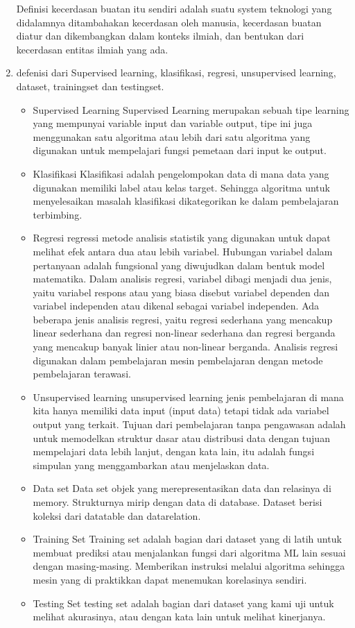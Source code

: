 \begin{enumerate}
	Definisi kecerdasan buatan itu sendiri adalah suatu system teknologi yang didalamnya ditambahakan kecerdasan oleh manusia, kecerdasan buatan diatur dan dikembangkan dalam konteks ilmiah, dan bentukan dari kecerdasan entitas ilmiah yang ada.
	\item defenisi dari Supervised learning, klasifikasi, regresi, unsupervised learning, dataset, trainingset dan testingset.
	\begin{itemize}
		\item Supervised Learning
		\hfill\break
		Supervised Learning merupakan sebuah tipe learning yang mempunyai variable input dan variable output, tipe ini juga menggunakan satu algoritma atau lebih dari satu algoritma yang digunakan untuk mempelajari fungsi  pemetaan dari input ke output.
		\item Klasifikasi
		\hfill\break
		Klasifikasi adalah pengelompokan data di mana data yang digunakan memiliki label atau kelas target. Sehingga algoritma untuk menyelesaikan masalah klasifikasi dikategorikan ke dalam pembelajaran terbimbing.
		\item Regresi
		\hfill\break
		regressi metode analisis statistik yang digunakan untuk dapat melihat efek antara dua atau lebih variabel. Hubungan variabel dalam pertanyaan adalah fungsional yang diwujudkan dalam bentuk model matematika. Dalam analisis regresi, variabel dibagi menjadi dua jenis, yaitu variabel respons atau yang biasa disebut variabel dependen dan variabel independen atau dikenal sebagai variabel independen. Ada beberapa jenis analisis regresi, yaitu regresi sederhana yang mencakup linear sederhana dan regresi non-linear sederhana dan regresi berganda yang mencakup banyak linier atau non-linear berganda. Analisis regresi digunakan dalam pembelajaran mesin pembelajaran dengan metode pembelajaran terawasi.
		\item Unsupervised learning 
		\hfill\break
		unsupervised learning jenis pembelajaran di mana kita hanya memiliki data input (input data) tetapi tidak ada variabel output yang terkait. Tujuan dari pembelajaran tanpa pengawasan adalah untuk memodelkan struktur dasar atau distribusi data dengan tujuan mempelajari data lebih lanjut, dengan kata lain, itu adalah fungsi simpulan yang menggambarkan atau menjelaskan data.
		\item Data set
		\hfill\break
		Data set objek yang merepresentasikan data dan relasinya di memory. Strukturnya mirip dengan data di database. Dataset berisi koleksi dari datatable dan datarelation.
		\item Training Set
		\hfill\break
		Training set adalah bagian dari dataset yang di latih untuk membuat prediksi atau menjalankan fungsi dari algoritma ML lain sesuai dengan masing-masing. Memberikan instruksi melalui algoritma sehingga mesin yang di praktikkan dapat menemukan korelasinya sendiri.
		\item Testing Set
		\hfill\break
		testing set adalah bagian dari dataset yang kami uji untuk melihat akurasinya, atau dengan kata lain untuk melihat kinerjanya.
	\end{itemize}
\end{enumerate}
